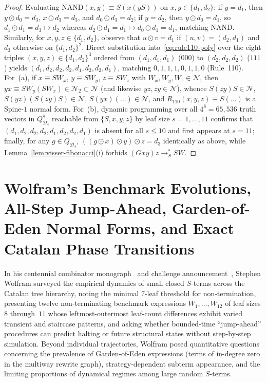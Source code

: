 \documentclass[11pt,reqno]{amsart}
\numberwithin{equation}{section}
\theoremstyle{plain}
\theoremstyle{definition}
\theoremstyle{remark}
\begin{document}
\begin{proof}
Evaluating $\mathrm{NAND}(x, y) \equiv S(x(y S))$ on $x, y \in \{d_1, d_2\}$: if $y = d_1$, then $y \odot d_0 = d_3$, $x \odot d_3 = d_3$, and $d_0 \odot d_3 = d_2$; if $y = d_2$, then $y \odot d_0 = d_1$, so $d_1 \odot d_1 = d_3 \mapsto d_2$ whereas $d_2 \odot d_1 = d_1 \mapsto d_0 \odot d_1 = d_1$, matching $\mathrm{NAND}$. Similarly, for $x, y, z \in \{d_1, d_2\}$, observe that $u \odot v = d_1$ if $(u, v) = (d_2, d_1)$ and $d_3$ otherwise on $\{d_1, d_2\}^2$. Direct substitution into~\eqref{eq:rule110-poly} over the eight triples $(x, y, z) \in \{d_1, d_2\}^3$ ordered from $(d_1, d_1, d_1)$ ($000$) to $(d_2, d_2, d_2)$ ($111$) yields $(d_1, d_2, d_2, d_2, d_1, d_2, d_2, d_1)$, matching $0, 1, 1, 1, 0, 1, 1, 0$ (Rule~110). For~(a), if $x \equiv S W_x$, $y \equiv S W_y$, $z \equiv S W_z$ with $W_x, W_y, W_z \in \mathcal{N}$, then $y x \equiv S W_y (S W_x) \in \mathcal{N}_2 \subset \mathcal{N}$ (and likewise $y z, z y \in \mathcal{N}$), whence $S(z y)S \in \mathcal{N}$, $S(y z)(S(z y)S) \in \mathcal{N}$, $S(y x)(\dots) \in \mathcal{N}$, and $R_{110}(x, y, z) \equiv S(\dots)$ is a Spine-$1$ normal form. For~(b), dynamic programming over all $4^8 = 65{,}536$ truth vectors in $Q_{\mathcal{D}_4}^8$ reachable from $\{S, x, y, z\}$ by leaf size $s = 1, \dots, 11$ confirms that $(d_1, d_2, d_2, d_2, d_1, d_2, d_2, d_1)$ is absent for all $s \le 10$ and first appears at $s = 11$; finally, for any $g \in Q_{\mathcal{D}_4}$, $((g \odot x) \odot y) \odot z = d_3$ identically as above, while Lemma~\ref{lem:visser-fibonacci}(i) forbids $(G x y) z \to_S^* S W$.
\end{proof}


\section{Wolfram's Benchmark Evolutions, All-Step Jump-Ahead, Garden-of-Eden Normal Forms, and Exact Catalan Phase Transitions}
\label{sec:asymptotics}

In his centennial combinator monograph~\cite{Wolfram2021CombinatorsBook} and challenge announcement~\cite{Wolfram2021Challenge}, Stephen Wolfram surveyed the empirical dynamics of small closed $S$-terms across the Catalan tree hierarchy, noting the minimal $7$-leaf threshold for non-termination, presenting twelve non-terminating benchmark expressions $W_1, \dots, W_{12}$ of leaf sizes $8$ through~$11$ whose leftmost-outermost leaf-count differences exhibit varied transient and staircase patterns, and asking whether bounded-time ``jump-ahead'' procedures can predict halting or future structural states without step-by-step simulation. Beyond individual trajectories, Wolfram posed quantitative questions concerning the prevalence of Garden-of-Eden expressions (terms of in-degree zero in the multiway rewrite graph), strategy-dependent subterm appearance, and the limiting proportions of dynamical regimes among large random $S$-terms.
\end{document}
